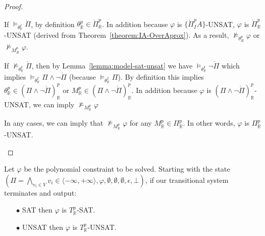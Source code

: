 \begin{proof}
\begin{enumerate}
\begin{itemize}
\begin{itemize}
If $\models_{\theta^I_\mathbb{R}} \mathring{\Pi}$, by definition $\theta^p_\mathbb{R} \in \mathring{\Pi}^p_\mathbb{R}$. In addition because $\varphi$ is $\{\mathring{\Pi}^p_IA\}$-UNSAT, $\varphi$ is $\mathring{\Pi}^p_\mathbb{R}$-UNSAT (derived from Theorem~\ref{theorem:IA-OverAprox}). As a result, $\not\models_{\theta^p_R}\varphi$ or $\not\models_{M^p_R}\varphi$.

If $\not\models_{\theta^I_\mathbb{R}} \mathring{\Pi}$, then by Lemma~\ref{lemma:model-sat-unsat} we have $\models_{\theta^I_\mathbb{R}} \neg\mathring{\Pi}$ which implies $\models_{\theta^I_\mathbb{R}} \Pi \wedge \neg\mathring{\Pi}$ (because $\models_{\theta^I_\mathbb{R}}\Pi$). By definition this implies $\theta^p_\mathbb{R} \in (\Pi \wedge \neg\mathring{\Pi})^p_\mathbb{R}$ or $M^p_\mathbb{R} \in (\Pi \wedge \neg\mathring{\Pi})^p_\mathbb{R}$. In addition because $\varphi$ is $(\Pi \wedge \neg\mathring{\Pi})^p_\mathbb{R}$-UNSAT, we can imply $\not\models_{M^p_\mathbb{R}}\varphi$

In any cases, we can imply that $\not\models_{M^p_\mathbb{R}}\varphi$ for any $M^p_\mathbb{R} \in \Pi^p_\mathbb{R}$. In other words, $\varphi$ is $\Pi^p_\mathbb{R}$-UNSAT.
\end{itemize}
\end{itemize}
\end{enumerate}
\end{proof}

\begin{theorem}
Let $\varphi$ be the polynomial constraint to be solved. Starting with the state $(\Pi = \bigwedge\limits_{v_i \in V} v_i \in \langle -\infty, +\infty \rangle, \varphi, \emptyset, \emptyset, \emptyset, \epsilon, \bot)$, if our transitional system terminates and output:
\begin{itemize}
\item[$\bullet$] SAT then $\varphi$ is $T^p_\mathbb{R}$-SAT.
\item[$\bullet$] UNSAT then $\varphi$ is $T^p_\mathbb{R}$-UNSAT.
\end{itemize}
\end{theorem}

